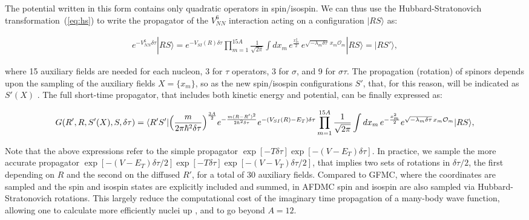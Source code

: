 \documentclass[aps,prc,twocolumn,superscriptaddress,showpacs,floatfix,nofootinbib]{revtex4-1}
\begin{document}
The potential written in this form contains only quadratic operators in spin/isospin. 
We can thus use the Hubbard-Stratonovich transformation~(\ref{eq:hs}) to write the
propagator of the $V_{NN}^6$ interaction acting on a configuration $|RS\rangle$ as:
\begin{widetext}
\begin{align}
e^{-V_{NN}^6\delta\tau}|RS\rangle=e^{-V_{SI}(R)\delta\tau}\prod_{m=1}^{15A}\frac{1}{\sqrt{2\pi}}
\displaystyle\int dx_m\,e^{\frac{x_m^2}{2}}\,e^{\sqrt{-\lambda_m\delta\tau}\,x_m \mathcal O_m}|RS\rangle
=|RS'\rangle ,
\end{align}
\end{widetext}
where 15 auxiliary fields are needed for each nucleon, 3 for $\tau$ operators, 3 for $\sigma$,
and 9 for $\sigma\tau$. The propagation (rotation) of spinors depends upon the sampling
of the auxiliary fields $X=\{x_m\}$, so as the new spin/isospin configurations $S'$, that, for this 
reason, will be indicated as $S'(X)$ .
The full short-time propagator, that includes both kinetic energy and potential, can be 
finally expressed as:
\begin{widetext}
\begin{align}
G(R',R,S'(X),S,\delta\tau)=\langle R'S'|\Big({m\over2\pi\hbar^2\delta\tau}\Big)^{3A\over2}e^{-{m(R-R')^2\over2\hbar^2\delta\tau}}
e^{-(V_{SI}(R)-E_T)\delta\tau}
\prod_{m=1}^{15A}{1\over\sqrt{2\pi}}\int dx_m\,e^{-{x_m^2\over2}}
e^{\sqrt{-\lambda_m\delta\tau}\,x_m \mathcal O_m}|RS\rangle,
\label{eq:prop}
\end{align}
\end{widetext}

Note that the above expressions refer to the simple propagator $\exp[-T\delta\tau]\exp[-(V-E_T)\delta\tau]$.
In practice, we sample the more accurate propagator 
$\exp[-(V-E_T)\delta\tau/2]\exp[-T\delta\tau]\exp[-(V-V_T)\delta\tau/2]$, that implies
two sets of rotations in $\delta\tau/2$, the first depending on $R$ and the second on 
the diffused $R'$, for a total of 30 auxiliary fields.
Compared to GFMC, where the coordinates are sampled and the spin and isospin states are 
explicitly included and summed, in AFDMC spin and isospin are also sampled via 
Hubbard-Stratonovich rotations. This largely reduce the computational cost of the
imaginary time propagation of a many-body wave function, allowing one to calculate 
more efficiently nuclei up , and to go beyond $A=12$.
\end{document}
